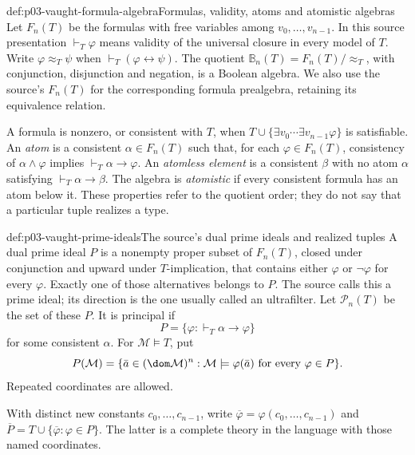 \begin{hbdefinition}{def:p03-vaught-formula-algebra}{Formulas, validity, atoms and atomistic algebras}
Let \(F_n(T)\) be the formulas with free variables among
\(v_0,\ldots,v_{n-1}\). In this source presentation
\(\vdash_T\varphi\) means validity of the universal closure in every
model of \(T\). Write \(\varphi\approx_T\psi\) when
\(\vdash_T(\varphi\leftrightarrow\psi)\).
The quotient \(\mathbb B_n(T)=F_n(T)/{\approx_T}\), with conjunction,
disjunction and negation, is a Boolean algebra.
We also use the source's \(F_n(T)\) for the corresponding formula
prealgebra, retaining its equivalence relation.

A formula is nonzero, or consistent with \(T\), when
\(T\cup\{\exists v_0\cdots\exists v_{n-1}\varphi\}\) is satisfiable.
An \emph{atom} is a consistent \(\alpha\in F_n(T)\) such that,
for each \(\varphi\in F_n(T)\), consistency of
\(\alpha\land\varphi\) implies \(\vdash_T\alpha\to\varphi\).
An \emph{atomless element} is a consistent \(\beta\) with no atom
\(\alpha\) satisfying \(\vdash_T\alpha\to\beta\).
The algebra is \emph{atomistic} if every consistent formula has an
atom below it. These properties refer to the quotient order; they
do not say that a particular tuple realizes a type.
\end{hbdefinition}

\begin{hbdefinition}{def:p03-vaught-prime-ideals}{The source's dual prime ideals and realized tuples}
A dual prime ideal \(P\) is a nonempty proper subset of \(F_n(T)\),
closed under conjunction and upward under \(T\)-implication, that
contains either \(\varphi\) or \(\neg\varphi\) for every \(\varphi\).
Exactly one of those alternatives belongs to \(P\).
The source calls this a prime ideal; its direction is the one usually
called an ultrafilter. Let \(\mathcal P_n(T)\) be the set of these \(P\).
It is principal if
\[
 P=\{\varphi:\vdash_T\alpha\to\varphi\}
\]
for some consistent \(\alpha\). For \(\mathcal M\models T\), put
\[
 P(\mathcal M)=\{\bar a\in(\dom\mathcal M)^n:
                         \mathcal M\models\varphi(\bar a)
                         \text{ for every }\varphi\in P\}.
\]
Repeated coordinates are allowed.

With distinct new constants \(c_0,\ldots,c_{n-1}\), write
\(\overline\varphi=\varphi(c_0,\ldots,c_{n-1})\) and
\(\overline P=T\cup\{\overline\varphi:\varphi\in P\}\).
The latter is a complete theory in the language with those named
coordinates.
\end{hbdefinition}

